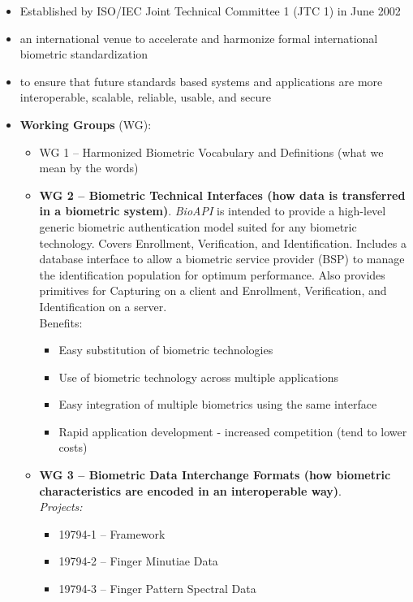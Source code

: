 \documentclass[a4paper]{article}
\begin{document}
      \begin{itemize}
        \item Established by ISO/IEC Joint Technical Committee 1 (JTC 1) in June 2002
        \item an international venue to accelerate and harmonize formal international biometric standardization
        \item to ensure that future standards based systems and applications are more interoperable, scalable, reliable, usable, and secure
        \item \textbf{Working Groups} (WG):
        \begin{itemize}
          \item WG 1 -- Harmonized Biometric Vocabulary and Definitions (what we mean by the words)
          \item \textbf{WG 2 -- Biometric Technical Interfaces (how data is transferred in a biometric system)}. \emph{BioAPI} is intended to provide a high-level generic biometric authentication model suited for any biometric technology. Covers Enrollment, Verification, and Identification. Includes a database interface to allow a biometric service provider (BSP) to manage the identification population for optimum performance. Also provides primitives for Capturing on a client and Enrollment, Verification, and Identification on a server.\\
          Benefits:
            \begin{itemize}
              \item Easy substitution of biometric technologies
              \item Use of biometric technology across multiple applications
              \item Easy integration of multiple biometrics using the same interface
              \item Rapid application development - increased competition (tend to lower costs)
            \end{itemize}
          \item \textbf{WG 3 -- Biometric Data Interchange Formats (how biometric characteristics are encoded in an interoperable way)}.\\
          \emph{Projects:}
          \begin{itemize}
            \item 19794-1 -- Framework
            \item 19794-2 -- Finger Minutiae Data
            \item 19794-3 -- Finger Pattern Spectral Data

\end{itemize}
\end{itemize}
\end{itemize}
\end{document}

